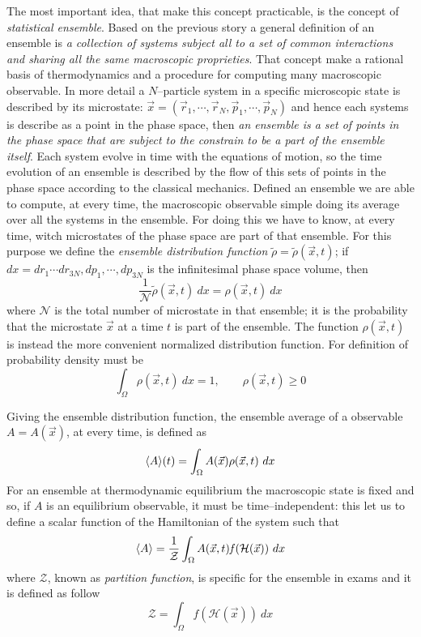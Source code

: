 The most important idea, that make this concept practicable, is the concept of \textit{statistical ensemble}. Based on the previous story a general definition of an ensemble is \textit{a collection of systems subject all to a set of common interactions and sharing all the same macroscopic proprieties}. That concept make a rational basis of thermodynamics and a procedure for computing many macroscopic observable. In more detail a $N$--particle system in a specific microscopic state is described by its microstate: $\vec x = (\vec r_1,\cdots,\vec r_N, \vec p_1, \cdots, \vec p_N)$ and hence each systems is describe as a point in the phase space, then \textit{an ensemble is a set of points in the phase space that are subject to the constrain to be a part of the ensemble itself}. Each system evolve in time with the equations of motion, so the time evolution of an ensemble is described by the flow of this sets of points in the phase space according to the classical mechanics. Defined an ensemble we are able to compute, at every time, the macroscopic observable simple doing its average over all the systems in the ensemble. For doing this we have to know, at every time, witch microstates of the phase space are part of that ensemble. For this purpose we define the \textit{ensemble distribution function} $\tilde\rho = \tilde\rho(\vec x,t)$; if $dx = dr_1\cdots dr_{3N}, dp_1, \cdots,dp_{3N}$ is the infinitesimal phase space volume, then
\begin{equation*}
	\frac{1}{\mathcal{N}}\tilde\rho(\vec x, t)\ dx = \rho(\vec x, t)\ dx
\end{equation*}
where $\mathcal{N}$ is the total number of microstate in that ensemble; it is the probability that the microstate $\vec x$ at a time $t$ is part of the ensemble. The function $\rho(\vec x, t)$ is instead the more convenient normalized distribution function. For definition of probability density must be
\begin{equation*}
		\int_{\Omega} \rho(\vec x, t)\ dx = 1, \qquad \rho(\vec x, t) \ge 0
\end{equation*}

Giving the ensemble distribution function, the ensemble average of a observable $A=A(\vec x)$, at every time, is defined as
\begin{equation*}
	\langle A \rangle(t) = \int_\Omega A(\vec x)\rho(\vec x, t)\ dx
\end{equation*}
For an ensemble at thermodynamic equilibrium the macroscopic state is fixed and so, if $A$ is an equilibrium observable, it must be time--independent: this let us to define a scalar function of the Hamiltonian of the system such that
\begin{equation}
	\langle A \rangle = \frac{1}{\mathcal{Z}} \int_\Omega A(\vec x, t) \mathit{f}(\mathcal{H}(\vec x))\ dx
\end{equation}
where $\mathcal{Z}$, known as \textit{partition function}, is specific for the ensemble in exams and it is defined as follow
\begin{equation}
	\mathcal{Z} = \int_\Omega \mathit{f}(\mathcal{H}(\vec x))\ dx
\end{equation}


